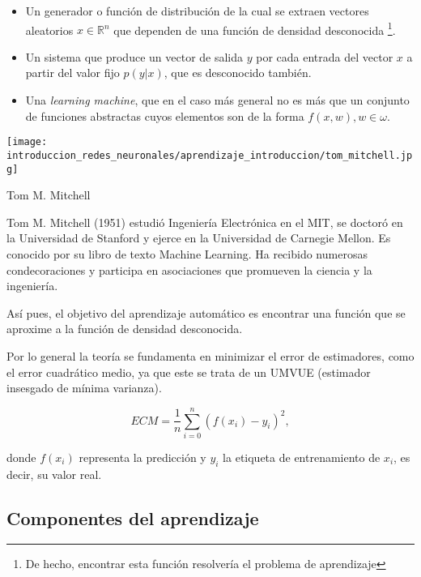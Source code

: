 \begin{itemize}
    \item Un generador o función de distribución de la cual se extraen 
    vectores aleatorios 
    $x \in \mathbb R^ n$ 
    que dependen de una función de densidad desconocida \footnote{De hecho, encontrar esta función resolvería el problema de aprendizaje}.
    
    \item Un sistema que produce un vector de salida $y$ por cada entrada del vector $x$ a partir del valor fijo $p(y|x)$, que es desconocido también. 
    
    \item Una \textit{learning machine}, que en el caso más general no es  más que un conjunto de funciones abstractas cuyos elementos son de la forma $f(x,w), w\in \omega$.
\end{itemize}

\begin{marginfigure}
    \texttt{[image: introduccion\_redes\_neuronales/aprendizaje\_introduccion/tom\_mitchell.jpg]}
   \caption{Tom M. Mitchell}
   \small
    Tom M. Mitchell
     \cite{mitchell-wikipedia} 
    (1951) estudió Ingeniería Electrónica en el MIT, 
    se doctoró en la Universidad de Stanford y ejerce en la Universidad de Carnegie Mellon. 
    Es conocido por su libro 
    de texto Machine Learning. Ha recibido numerosas condecoraciones y 
   participa en asociaciones que promueven la ciencia y la ingeniería.
\end{marginfigure}



Así pues, el objetivo del aprendizaje automático es encontrar una función que se aproxime a la función de densidad desconocida.

Por lo general la teoría se fundamenta en minimizar el error de estimadores, como el error cuadrático medio, ya que este se trata de un UMVUE  (estimador insesgado de mínima varianza). 

$$ECM = \frac{1}{n} \sum_{i=0} ^n (f(x_i) - y_i)^2,$$

donde $f(x_i)$ representa la predicción y $y_i$ la etiqueta de entrenamiento de $x_i$, es decir, su valor real. 

\subsection{Componentes del aprendizaje}  

